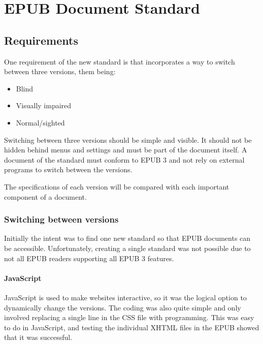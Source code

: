 \chapter{EPUB Document Standard}
\label{ch:EPUB Document Standard}

\section{Requirements}

One requirement of the new standard is that incorporates a way to switch between three versions, them being:

\begin{itemize}
	\item Blind
	\item Visually impaired
	\item Normal/sighted 
\end{itemize}

Switching between three versions should be simple and visible. It should not be hidden behind menus and settings and must be part of the document itself. A document of the standard must conform to EPUB 3 and not rely on external programs to switch between the versions.

The specifications of each version will be compared with each important component of a document.


\subsection{Switching between versions}

Initially the intent was to find one new standard so that EPUB documents can be accessible. Unfortunately, creating a single standard was not possible due to not all EPUB readers supporting all EPUB 3 features.

\subsubsection{JavaScript}
JavaScript is used to make websites interactive, so it was the logical option to dynamically change the versions. The coding was also quite simple and only involved replacing a single line in the CSS file with programming. This was easy to do in JavaScript, and testing the individual XHTML files in the EPUB showed that it was successful. 

